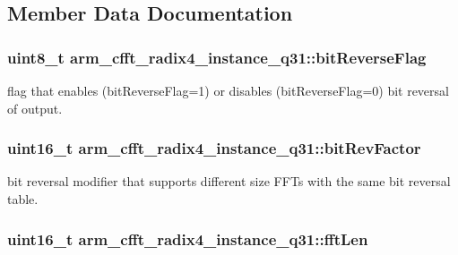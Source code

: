 \subsection{Member Data Documentation}
\hypertarget{structarm__cfft__radix4__instance__q31_a5a7c4f4c7b3fb655cbb2bc11ef160a2a}{
\subsubsection[{bit\-Reverse\-Flag}]{\setlength{\rightskip}{0pt plus 5cm}uint8\-\_\-t arm\-\_\-cfft\-\_\-radix4\-\_\-instance\-\_\-q31\-::bit\-Reverse\-Flag}}\label{structarm__cfft__radix4__instance__q31_a5a7c4f4c7b3fb655cbb2bc11ef160a2a}
flag that enables (bit\-Reverse\-Flag=1) or disables (bit\-Reverse\-Flag=0) bit reversal of output. \hypertarget{structarm__cfft__radix4__instance__q31_a94d2fead4efa4d5eaae142bbe30b0e15}{
\subsubsection[{bit\-Rev\-Factor}]{\setlength{\rightskip}{0pt plus 5cm}uint16\-\_\-t arm\-\_\-cfft\-\_\-radix4\-\_\-instance\-\_\-q31\-::bit\-Rev\-Factor}}\label{structarm__cfft__radix4__instance__q31_a94d2fead4efa4d5eaae142bbe30b0e15}
bit reversal modifier that supports different size F\-F\-Ts with the same bit reversal table. \hypertarget{structarm__cfft__radix4__instance__q31_ab413d2a5d3f45fa187d93813bf3bf81b}{
\subsubsection[{fft\-Len}]{\setlength{\rightskip}{0pt plus 5cm}uint16\-\_\-t arm\-\_\-cfft\-\_\-radix4\-\_\-instance\-\_\-q31\-::fft\-Len}}\label{structarm__cfft__radix4__instance__q31_ab413d2a5d3f45fa187d93813bf3bf81b}
